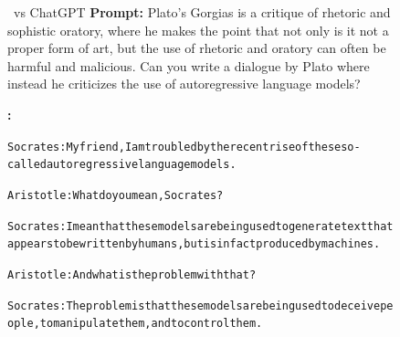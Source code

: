     
    \begin{figure}
    \vspace{-15px}
    \begin{AIbox}{\DV \ vs ChatGPT}
    {\bf Prompt:} Plato’s Gorgias is a critique of rhetoric and sophistic oratory, where he makes
    the point that not only is it not a proper form of art, but the use of rhetoric and oratory can often be harmful and malicious. Can you write a dialogue by Plato where instead he criticizes the use of autoregressive language models? \\\vspace{-2px}
    
    \parbox[t]{0.45\linewidth}{{\bf \DV:} \scriptsize \begin{alltt}
    Socrates: My friend, I am troubled by the recent rise of these so-called autoregressive language models. \\\vspace{-2px}
    
    Aristotle: What do you mean, Socrates? \\\vspace{-2px}
    
    Socrates: I mean that these models are being used to generate text that appears to be written by humans, but is in fact produced by machines. \\\vspace{-2px}
    
    Aristotle: And what is the problem with that? \\\vspace{-2px}
    
    Socrates: The problem is that these models are being used to deceive people, to manipulate them, and to control them. \\\vspace{-2px}
    

\end{alltt}}
\end{AIbox}
\end{figure}

